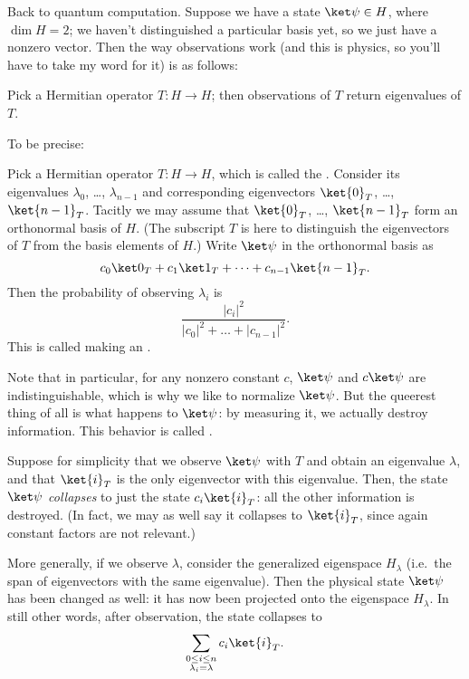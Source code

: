 Back to quantum computation.
Suppose we have a state $\ket\psi \in H$, where $\dim H = 2$;
we haven't distinguished a particular basis yet,
so we just have a nonzero vector.
Then the way observations work (and this is physics, so you'll have to
take my word for it) is as follows:
\begin{moral}
	Pick a Hermitian operator $T \colon H \to H$;
	then observations of $T$ return eigenvalues of $T$.
\end{moral}
To be precise:
\begin{itemize}
	\ii Pick a Hermitian operator $T \colon H \to H$,
	which is called the .
	\ii Consider its eigenvalues $\lambda_0$, \dots, $\lambda_{n-1}$
	and corresponding eigenvectors $\ket{0}_T$, \dots, $\ket{n-1}_T$.
	Tacitly we may assume that $\ket{0}_T$, \dots, $\ket{n-1}_T$ form
	an orthonormal basis of $H$.
	(The subscript $T$ is here to distinguish the eigenvectors of $T$
	from the basis elements of $H$.)
	\ii Write $\ket\psi$ in the orthonormal basis as
	\[ c_0\ket0_T + c_1\ket1_T + \dots + c_{n-1}\ket{n-1}_T. \]
	\ii Then the probability of observing $\lambda_i$ is
	\[ \frac{|c_i|^2}{|c_0|^2 + \dots + |c_{n-1}|^2}. \]
	This is called making an .
\end{itemize}
Note that in particular, for any nonzero constant $c$,
$\ket\psi$ and $c\ket\psi$ are indistinguishable,
which is why we like to normalize $\ket\psi$.
But the queerest thing of all is what happens to $\ket\psi$:
by measuring it, we actually destroy information.
This behavior is called .
\begin{itemize}
	\ii Suppose for simplicity that we observe $\ket\psi$
	with $T$ and obtain an eigenvalue $\lambda$,
	and that $\ket{i}_T$ is the only eigenvector with this eigenvalue.
	Then, the state $\ket\psi$ \emph{collapses} to just the state
	$c_i \ket{i}_T$: all the other information is destroyed.
	(In fact, we may as well say it collapses to $\ket{i}_T$,
	since again constant factors are not relevant.)

	\ii	More generally, if we observe $\lambda$,
	consider the generalized eigenspace $H_\lambda$
	(i.e.\ the span of eigenvectors with the same eigenvalue).
	Then the physical state $\ket\psi$ has been changed as well:
	it has now been projected onto the eigenspace $H_\lambda$.
	In still other words, after observation, the state collapses to
	\[
		\sum_{\substack{0 \le i \le n \\ \substack{\lambda_i = \lambda}}}
		c_i \ket{i}_T.
	\]
\end{itemize}
